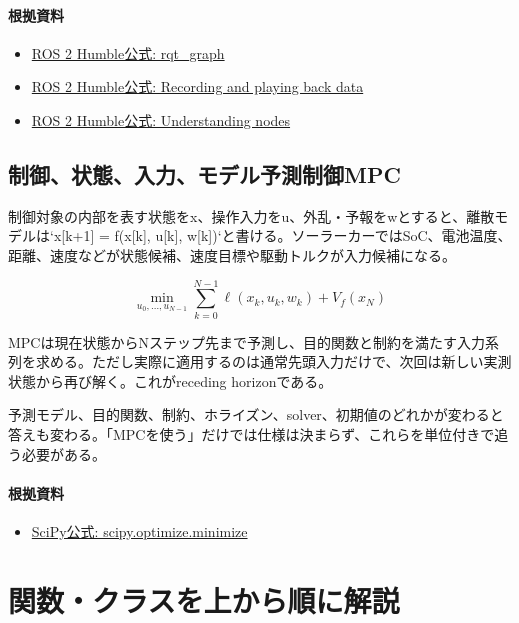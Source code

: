 \documentclass[a4paper,11pt]{article}
\begin{document}
\paragraph{根拠資料}
\begin{itemize}[leftmargin=1.6em]
\item \href{https://docs.ros.org/en/ros2_packages/humble/api/rqt_graph/index.html}{ROS 2 Humble公式: rqt\_graph}
\item \href{https://docs.ros.org/en/humble/Tutorials/Beginner-CLI-Tools/Recording-And-Playing-Back-Data/Recording-And-Playing-Back-Data.html}{ROS 2 Humble公式: Recording and playing back data}
\item \href{https://docs.ros.org/en/humble/Tutorials/Beginner-CLI-Tools/Understanding-ROS2-Nodes/Understanding-ROS2-Nodes.html}{ROS 2 Humble公式: Understanding nodes}
\end{itemize}

\subsection{制御、状態、入力、モデル予測制御MPC}
制御対象の内部を表す状態をx、操作入力をu、外乱・予報をwとすると、離散モデルは`x[k+1] = f(x[k], u[k], w[k])`と書ける。ソーラーカーではSoC、電池温度、距離、速度などが状態候補、速度目標や駆動トルクが入力候補になる。


\[
\min_{u_0,\ldots,u_{N-1}} \sum_{k=0}^{N-1}\ell(x_k,u_k,w_k)+V_f(x_N)
\]

MPCは現在状態からNステップ先まで予測し、目的関数と制約を満たす入力系列を求める。ただし実際に適用するのは通常先頭入力だけで、次回は新しい実測状態から再び解く。これがreceding horizonである。


予測モデル、目的関数、制約、ホライズン、solver、初期値のどれかが変わると答えも変わる。「MPCを使う」だけでは仕様は決まらず、これらを単位付きで追う必要がある。

\paragraph{根拠資料}
\begin{itemize}[leftmargin=1.6em]
\item \href{https://docs.scipy.org/doc/scipy/reference/generated/scipy.optimize.minimize.html}{SciPy公式: scipy.optimize.minimize}
\end{itemize}



        \section{関数・クラスを上から順に解説}
\end{document}
